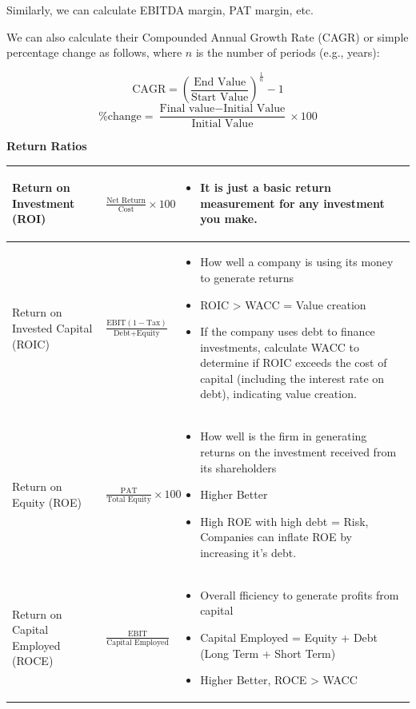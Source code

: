\documentclass[12pt]{article}
\begin{document}
Similarly, we can calculate EBITDA margin, PAT margin, etc.

We can also calculate their Compounded Annual Growth Rate (CAGR) or simple percentage change as follows, where \(n\) is the number of periods (e.g., years):

\[
\text{CAGR} = \left( \frac{\text{End Value}}{\text{Start Value}} \right)^{\frac{1}{n}} - 1
\]
\[
\text{\% change} = \frac{\text{Final value} - \text{Initial Value}}{\text{Initial Value}} \times 100
\]

\textbf{Return Ratios}

\renewcommand{\arraystretch}{1.5}
\begin{longtable}{|>{\raggedright\arraybackslash}m{4.5cm}|>{\raggedright\arraybackslash}m{5cm}|>{\raggedright\arraybackslash}m{6cm}|}
\hline
Return on Investment (ROI) & 
$\frac{\text{Net Return}}{\text{Cost}} \times 100$ &
\begin{itemize}
\item It is just a basic return measurement for any investment you make.
\end{itemize} \\
\hline

Return on Invested Capital (ROIC) & 
$\frac{\text{EBIT}(1-\text{Tax})}{\text{Debt} + \text{Equity}}$ &
\begin{itemize}
\item How well a company is using its money to generate returns
\item ROIC > WACC = Value creation
\item If the company uses debt to finance investments, calculate WACC to determine if ROIC exceeds the cost of capital (including the interest rate on debt), indicating value creation.
\end{itemize} \\
\hline

Return on Equity (ROE) & 
$\frac{\text{PAT}}{\text{Total Equity}} \times 100$ &
\begin{itemize}
\item How well is the firm in generating returns on the investment received from its shareholders
\item Higher Better
\item High ROE with high debt = Risk, Companies can inflate ROE by increasing it's debt.
\end{itemize} \\
\hline

Return on Capital Employed (ROCE) & 
$\frac{\text{EBIT}}{\text{Capital Employed}}$ &
\begin{itemize}
\item Overall fficiency to generate profits from capital
\item Capital Employed = Equity + Debt (Long Term + Short Term)
\item Higher Better, ROCE > WACC
\end{itemize} \\
\hline


\end{longtable}
\end{document}
